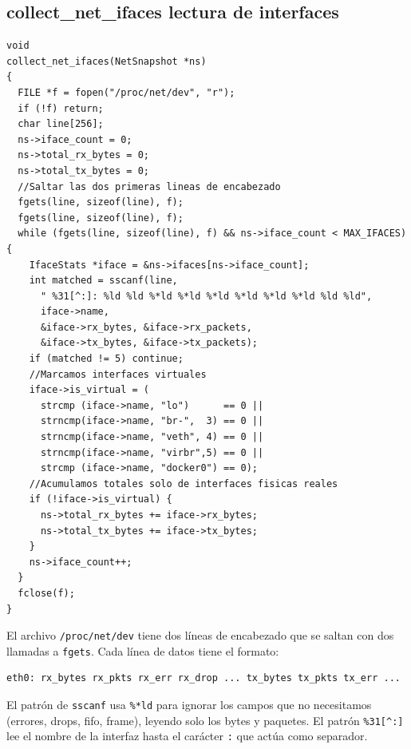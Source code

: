 \documentclass[12pt,letterpaper]{article}
\begin{document}
\subsection*{collect\_net\_ifaces lectura de interfaces}

\begin{lstlisting}[style=modernc, caption={\texttt{net\_monitor.c} collect\_net\_ifaces()}]
void
collect_net_ifaces(NetSnapshot *ns)
{
  FILE *f = fopen("/proc/net/dev", "r");
  if (!f) return;
  char line[256];
  ns->iface_count = 0;
  ns->total_rx_bytes = 0;
  ns->total_tx_bytes = 0;
  //Saltar las dos primeras lineas de encabezado
  fgets(line, sizeof(line), f);
  fgets(line, sizeof(line), f);
  while (fgets(line, sizeof(line), f) && ns->iface_count < MAX_IFACES) {
    IfaceStats *iface = &ns->ifaces[ns->iface_count];
    int matched = sscanf(line,
      " %31[^:]: %ld %ld %*ld %*ld %*ld %*ld %*ld %*ld %ld %ld",
      iface->name,
      &iface->rx_bytes, &iface->rx_packets,
      &iface->tx_bytes, &iface->tx_packets);
    if (matched != 5) continue;
    //Marcamos interfaces virtuales
    iface->is_virtual = (
      strcmp (iface->name, "lo")      == 0 ||
      strncmp(iface->name, "br-",  3) == 0 ||
      strncmp(iface->name, "veth", 4) == 0 ||
      strncmp(iface->name, "virbr",5) == 0 ||
      strcmp (iface->name, "docker0") == 0);
    //Acumulamos totales solo de interfaces fisicas reales
    if (!iface->is_virtual) {
      ns->total_rx_bytes += iface->rx_bytes;
      ns->total_tx_bytes += iface->tx_bytes;
    }
    ns->iface_count++;
  }
  fclose(f);
}
\end{lstlisting}

El archivo \texttt{/proc/net/dev} tiene dos líneas de encabezado que se saltan con dos llamadas a \texttt{fgets}. Cada línea de datos tiene el formato:

\begin{Verbatim}[fontsize=\small]
  eth0: rx_bytes rx_pkts rx_err rx_drop ... tx_bytes tx_pkts tx_err ...
\end{Verbatim}

El patrón de \texttt{sscanf} usa \texttt{\%*ld} para ignorar los campos que no necesitamos (errores, drops, fifo, frame), leyendo solo los bytes y paquetes. El patrón \texttt{\%31[\^{}:]} lee el nombre de la interfaz hasta
el carácter \texttt{:} que actúa como separador.

\end{document}

